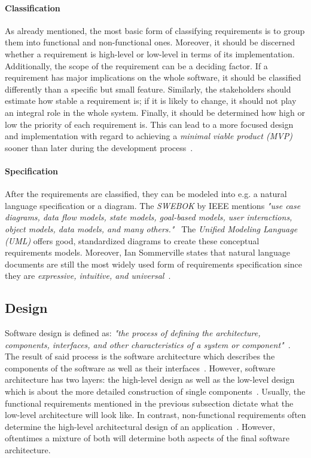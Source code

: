 \documentclass[12pt,a4paper,twoside]{report}
\begin{document}
\paragraph{Classification}
As already mentioned, the most basic form of classifying requirements is to group
them into functional and non-functional ones. Moreover, it should be discerned
whether a requirement is high-level or low-level in terms of its implementation.
Additionally, the scope of the requirement can be a deciding factor.
If a requirement has major implications on the whole software, it should be classified
differently than a specific but small feature. Similarly, the stakeholders should
estimate how stable a requirement is; if it is likely to change, it should not
play an integral role in the whole system.
Finally, it should be determined how high or low the priority of each requirement is.
This can lead to a more focused design and implementation with regard to achieving
a \textit{minimal viable product (MVP)} sooner than later during
the development process~\cite{swebok, sommerville-se}.

\paragraph{Specification}
After the requirements are classified, they can be modeled into e.g.
a natural language specification or a diagram.
The \textit{SWEBOK} by IEEE mentions \textit{"use case diagrams, data flow models,
state models, goal-based models, user interactions,
object models, data models, and many others."}~\cite{swebok}
The \textit{Unified Modeling Language (UML)} offers good, standardized diagrams
to create these conceptual requirements models.
Moreover, Ian Sommerville states that natural language documents
are still the most widely used form of requirements specification since they are
\textit{expressive, intuitive, and universal}~\cite{sommerville-se}.


\subsection{Design} \label{subsect:design}

Software design is defined as: \textit{"the process of defining
the architecture, components, interfaces, and other characteristics
of a system or component"}~\cite{iso-se}.
The result of said process is the software architecture which describes the
components of the software as well as their interfaces~\cite{swebok}.
However, software architecture has two layers: the high-level design as well as
the low-level design which is about the more detailed
construction of single components~\cite{iso-sdlc}.
Usually, the functional requirements mentioned in the previous subsection dictate
what the low-level architecture will look like. In contrast, non-functional
requirements often determine the high-level architectural design of an application~\cite{bosch-sa}.
However, oftentimes a mixture of both will determine both aspects of the final software architecture.
\end{document}
